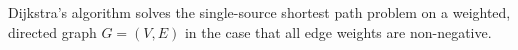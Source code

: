 
Dijkstra's algorithm solves the single-source shortest path problem on a weighted, directed graph $G=(V,E)$ in the case that all edge weights are non-negative.

